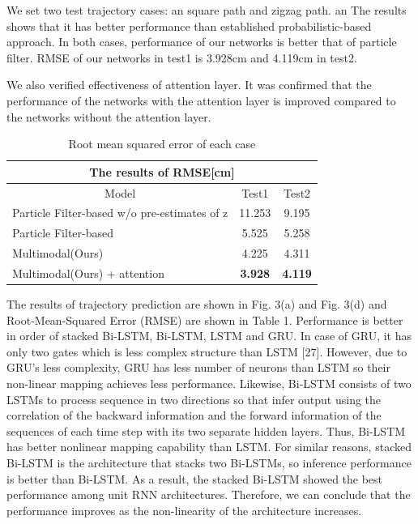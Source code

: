 \documentclass{ieeeaccess}
\begin{document}
We set two test trajectory cases: an square path and zigzag path. an The results shows that it has better performance than established probabilistic-based approach. In both cases, performance of our networks  is better that of particle filter. RMSE of our networks in test1 is 3.928cm and 4.119cm in test2.

We also verified effectiveness of attention layer. It was confirmed that the performance of the networks with the attention layer is improved compared to the networks without the attention layer.

\begin{table}[h]
	\begin{tabular}{lllcc}
		\hline
		\multicolumn{5}{c}{The results of RMSE{[}cm{]}}                                                                          \\ \hline
		\multicolumn{3}{c|}{Model}                                        & \multicolumn{1}{c|}{Test1}          & Test2          \\ \hline
		\multicolumn{3}{l|}{Particle Filter-based w/o pre-estimates of z} & \multicolumn{1}{c|}{11.253}         & 9.195          \\
		\multicolumn{3}{l|}{Particle Filter-based}                        & \multicolumn{1}{c|}{5.525}          & 5.258          \\
		\multicolumn{3}{l|}{Multimodal(Ours)}                                   & \multicolumn{1}{c|}{4.225}          & 4.311          \\
		\multicolumn{3}{l|}{Multimodal(Ours) + attention}                       & \multicolumn{1}{c|}{\textbf{3.928}} & \textbf{4.119}
	\end{tabular}
	\caption{Root mean squared error of each case}
	\label{table:RMSE_table}
\end{table}



The results of trajectory prediction are shown in Fig. 3(a) and Fig. 3(d) and
Root-Mean-Squared Error (RMSE) are shown in Table 1. Performance is better
in order of stacked Bi-LSTM, Bi-LSTM, LSTM and GRU. In case of GRU, it
has only two gates which is less complex structure than LSTM [27]. However,
due to GRU's less complexity, GRU has less number of neurons than LSTM so
their non-linear mapping achieves less performance. Likewise, Bi-LSTM consists
of two LSTMs to process sequence in two directions so that infer output using
the correlation of the backward information and the forward information of the
sequences of each time step with its two separate hidden layers. Thus, Bi-LSTM
has better nonlinear mapping capability than LSTM. For similar reasons, stacked
Bi-LSTM is the architecture that stacks two Bi-LSTMs, so inference performance
is better than Bi-LSTM. As a result, the stacked Bi-LSTM showed the best
performance among unit RNN architectures. Therefore, we can conclude that
the performance improves as the non-linearity of the architecture increases.
\end{document}
